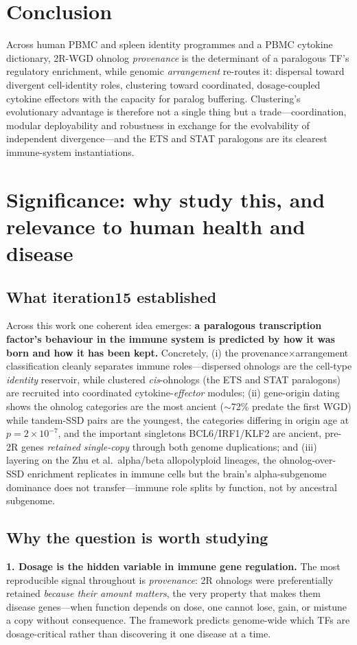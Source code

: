 \documentclass[11pt]{article}
\begin{document}
\section{Conclusion}
Across human PBMC and spleen identity programmes and a PBMC cytokine dictionary, 2R-WGD
ohnolog \emph{provenance} is the determinant of a paralogous TF's regulatory enrichment,
while genomic \emph{arrangement} re-routes it: dispersal toward divergent cell-identity
roles, clustering toward coordinated, dosage-coupled cytokine effectors with the capacity
for paralog buffering. Clustering's evolutionary advantage is therefore not a single thing
but a trade---coordination, modular deployability and robustness in exchange for the
evolvability of independent divergence---and the ETS and STAT paralogons are its
clearest immune-system instantiations.

\section{Significance: why study this, and relevance to human health and disease}

\subsection{What iteration15 established}
Across this work one coherent idea emerges: \textbf{a paralogous transcription factor's
behaviour in the immune system is predicted by how it was born and how it has been kept.}
Concretely, (i) the provenance$\times$arrangement classification cleanly separates immune
roles---dispersed ohnologs are the cell-type \emph{identity} reservoir, while clustered
\emph{cis}-ohnologs (the ETS and STAT paralogons) are recruited into coordinated
cytokine-\emph{effector} modules; (ii) gene-origin dating shows the ohnolog categories are the
most ancient ($\sim$72\% predate the first WGD) while tandem-SSD pairs are the youngest, the
categories differing in origin age at $p=2\times10^{-7}$, and the important singletons
BCL6/IRF1/KLF2 are ancient, pre-2R genes \emph{retained single-copy} through both genome
duplications; and (iii) layering on the Zhu et al.\ alpha/beta allopolyploid lineages, the
ohnolog-over-SSD enrichment replicates in immune cells but the brain's alpha-subgenome
dominance does not transfer---immune role splits by function, not by ancestral subgenome.

\subsection{Why the question is worth studying}
\textbf{1. Dosage is the hidden variable in immune gene regulation.} The most reproducible
signal throughout is \emph{provenance}: 2R ohnologs were preferentially retained \emph{because
their amount matters}, the very property that makes them disease genes---when function depends
on dose, one cannot lose, gain, or mistune a copy without consequence. The framework predicts
genome-wide which TFs are dosage-critical rather than discovering it one disease at a time.
\end{document}
